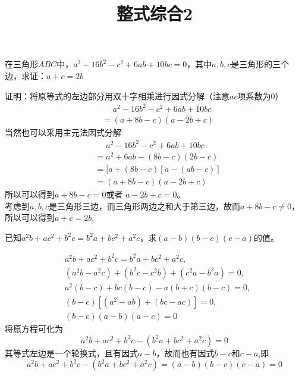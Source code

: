\documentclass[windows,csize4,answers]{BHCexam}
\title{整式综合2}
\begin{document}
\maketitle

\begin{groups}

    \begin{questions}[]

        \question[5]  在三角形$ABC$中，$a^2-16b^2-c^2+6ab+10bc=0$，其中$a,b,c$是三角形的三个边，求证：$a+c=2b$
        \begin{solution}{0.5cm}
            \methodonly 证明：将原等式的左边部分用双十字相乘进行因式分解（注意$ac$项系数为$0$） \\
            \[
                \begin{aligned}
                     & \phantom{=} a^2-16b^2-c^2+6ab+10bc \\
                     & = (a+8b-c)(a-2b+c)
                \end{aligned}
            \]
            当然也可以采用主元法因式分解
            \[
                \begin{aligned}
                     & \phantom{=} a^2-16b^2-c^2+6ab+10bc \\
                     & = a^2+6ab-(8b-c)(2b-c)             \\
                     & =[a+(8b-c)[a-(ab-c)]               \\
                     & = (a+8b-c)(a-2b+c)
                \end{aligned}
            \]
            所以可以得到$a+8b-c=0$或者 $a-2b+c=0$。\\
            考虑到$a,b,c$是三角形三边，而三角形两边之和大于第三边，故而$a+8b-c\neq 0$，所以可以得到$a+c=2b$.
        \end{solution}
        \vspace{3.5cm}

        \question[5]  已知$a^2b+ac^2+b^2c=b^2a+bc^2+a^2c$，求$(a-b)(b-c)(c-a)$的值。
        \begin{solution}{0.5cm}
            \method
            \[
                \begin{aligned}
                     & a^2b+ac^2+b^2c=b^2a+bc^2+a^2c,         \\
                     & (a^2b-a^2c)+(b^2c-c^2b)+(c^2a-b^2a)=0, \\
                     & a^2(b-c)+bc(b-c)-a(b+c)(b-c)=0,        \\
                     & (b-c)[(a^2-ab)+(bc-ac)]=0,             \\
                     & (b-c)(a-b)(a-c) =0
                \end{aligned}
            \]
            \method 将原方程可化为
            \[
                a^2b+ac^2+b^2c-(b^2a+bc^2+a^2c)=0
            \]
            其等式左边是一个轮换式，且有因式$a-b$，故而也有因式$b-c$和$c-a$,即
            \[
                a^2b+ac^2+b^2c-(b^2a+bc^2+a^2c)=(a-b)(b-c)(c-a)=0
            \]
        \end{solution}
        \vspace{3.5cm}



\end{questions}
\end{groups}
\end{document}
